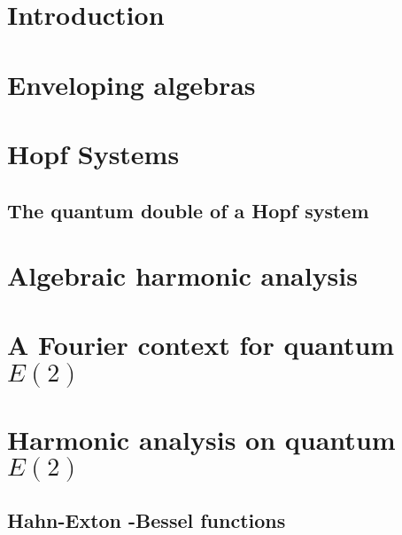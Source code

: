 \documentclass[landscape]{book}
\begin{document}
\tableofcontents

\chapter{Introduction}



\chapter{Enveloping algebras}
\label{chapter:Enveloping_algebras}










\chapter{Hopf Systems}
\label{chapter:Hopf_systems}









\section{The quantum double of a Hopf system}
\label{quantum_double}





\chapter{Algebraic harmonic analysis}
\label{chapter:algebraic_harmonic_analysis}




\chapter{A Fourier context for quantum $E(2)$}
\label{chapter:Fourier_context_for_quantumE2}








\chapter{Harmonic analysis on quantum $E(2)$}
\label{chapter:Harmonic_analysis_on_quantumE2}


\section{Hahn-Exton {\protect\qfragile}-Bessel functions}
\label{sec:qExp_and_qBessel}

\end{document}
